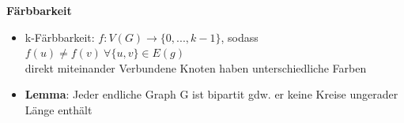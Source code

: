 \documentclass[12pt,a4paper]{article}
\begin{document}
\begin{figure}[H]
\end{figure}

\textbf{Färbbarkeit}\\
\begin{itemize}
\item k-Färbbarkeit: $f: V(G) \rightarrow \{0,...,k-1 \}$, sodass\\
$f(u) \neq f(v) \: \forall \{u,v\} \in E(g)$\\
direkt miteinander Verbundene Knoten haben unterschiedliche Farben
\item \textbf{Lemma}: Jeder endliche Graph G ist bipartit gdw. er keine Kreise ungerader Länge enthält
\end{itemize}
\end{document}
